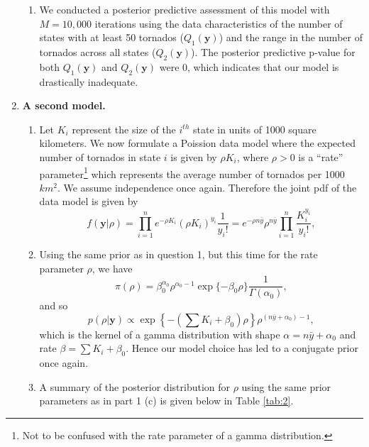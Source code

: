 \documentclass[12pt]{article}
\begin{document}
\begin{enumerate}[leftmargin=*]
\begin{enumerate}[leftmargin=1mm]
      \item We conducted a posterior predictive assessment of this model with $M = 10,000$ iterations 
        using the data characteristics of the number of states with at least 50
        tornados ($Q_1(\bm{y})$) and the range in the number of tornados across all states ($Q_2(\bm{y})$). The posterior predictive p-value for
        both $Q_1(\bm{y})$ and $Q_2(\bm{y})$ were 0, which indicates that our model is drastically inadequate.

    \end{enumerate}

    \newpage
  \item \textbf{A second model.}
    \begin{enumerate}[leftmargin=1mm]
      \item Let $K_i$ represent the size of the $i^{th}$ state in units of 1000 square kilometers. We now formulate a Poission data model where the 
        expected number of tornados in state $i$ is given by $\rho K_i$, where $\rho > 0$ is a ``rate'' parameter\footnote{Not to be confused with the
        rate parameter of a gamma distribution.} which represents the average number of tornados per 1000 $km^2$.
        We assume independence once again.
        Therefore the joint pdf of the data model is given by 
        \[
          f(\bm{y}|\rho) = \prod_{i=1}^{n} e^{-\rho K_i}(\rho K_i)^{y_i} \frac{1}{y_i!} = e^{-\rho n\bar{y}}\rho^{n\bar{y}}
          \prod_{i=1}^{n}\frac{K_i^{y_i}}{y_i!},
        \]

      \item Using the same prior as in question 1, but this time for the rate parameter $\rho$, we have 
        \[
          \pi(\rho) = \beta_0^{\alpha_0}\rho^{\alpha_0 - 1}\exp\{-\beta_0\rho\} \frac{1}{\Gamma(\alpha_0)},
        \]
        and so
        \[
          p(\rho|\bm{y}) \propto \exp\left\{-\left(\sum K_i + \beta_0\right)\rho\right\} \rho^{(n\bar{y} + \alpha_0) - 1},
        \]
        which is the kernel of a gamma distribution with shape $\alpha = n\bar{y} + \alpha_0$ and rate $\beta = \sum K_i + \beta_0$.
        Hence our model choice has led to a conjugate prior once again.

      \item A summary of the posterior distribution for $\rho$ using the same prior parameters as in part 1 (c) is given below in Table \ref{tab:2}.


\end{enumerate}
\end{enumerate}
\end{document}
